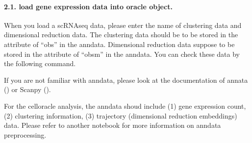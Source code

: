 \documentclass[letterpaper,10pt,english]{sphinxmanual}
\begin{document}
{
\begin{sphinxVerbatim}[commandchars=\\\{\}]
\llap{\color{nbsphinxin}[7]:\,\hspace{\fboxrule}\hspace{\fboxsep}}
  
\end{sphinxVerbatim}
}


\paragraph{2.1. load gene expression data into oracle object.}
\label{\detokenize{notebooks/04_Network_analysis/Network_analysis_with_Paul_etal_2015_data:2.1.-load-gene-expression-data-into-oracle-object.}}
When you load a scRNA\sphinxhyphen{}seq data, please enter the name of clustering data and dimensional reduction data. The clustering data should be to be stored in the attribute of “obs” in the anndata. Dimensional reduction data suppose to be stored in the attribute of “obsm” in the anndata. You can check these data by the following command.

If you are not familiar with anndata, please look at the documentation of annata () or Scanpy ().

For the celloracle analysis, the anndata shoud include (1) gene expression count, (2) clustering information, (3) trajectory (dimensional reduction embeddings) data. Please refer to another notebook for more information on anndata preprocessing.

{
\begin{sphinxVerbatim}[commandchars=\\\{\}]
\llap{\color{nbsphinxin}[8]:\,\hspace{\fboxrule}\hspace{\fboxsep}}
 
 
\end{sphinxVerbatim}
}
\end{document}
